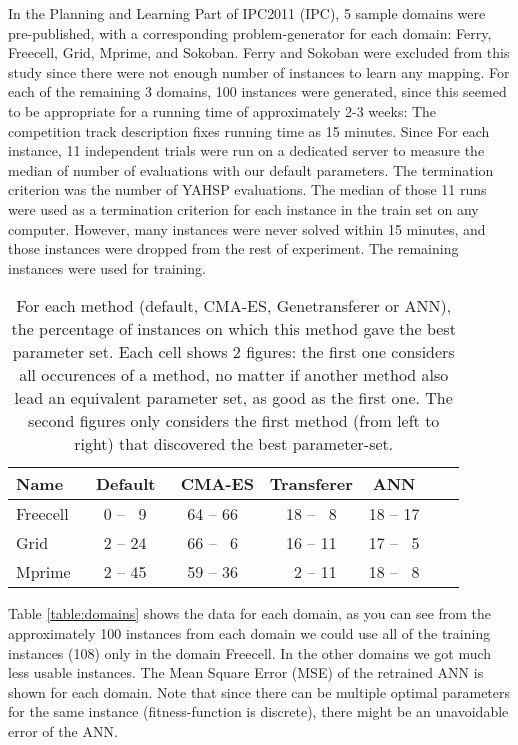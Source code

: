 \documentclass{MYsig-alternate}
\begin{document}
In the Planning and Learning Part of IPC2011 (IPC), 5 sample domains were pre-published, with a corresponding problem-generator for each domain: Ferry, Freecell, Grid, Mprime, and Sokoban. Ferry and Sokoban were excluded from this study since there were not enough number of instances to learn any mapping. For each of the remaining 3 domains, 100 instances were generated, since this seemed to be appropriate for a running time of approximately 2-3 weeks: The competition track description fixes running time as 15 minutes. Since For each instance, 11 independent trials were run on a dedicated server to measure the median of number of evaluations with our default parameters. The termination criterion was the number of YAHSP evaluations. The median of those 11 runs were used as a termination criterion for each instance in the train set on any computer. However, many instances were never solved within 15 minutes, and those instances were dropped from the rest of experiment. The remaining instances were used for training.


 \begin{table}[tb!]
\centering
\begin{tabular}{l c c c c c c}
\hline\hline
Name & \ Default & \ CMA-ES &  Transferer & ANN \\ 
\hline
Freecell & ~0 -- ~9& 64 -- 66  & 18 -- ~8  & 18 -- 17     \\
Grid & ~2 -- 24 & 66 -- ~6  & 16 -- 11 & 17 -- ~5  &    \\
Mprime &  ~2 -- 45& 59 -- 36 & ~2 -- 11  & 18 -- ~8  &    \\
\hline
\end{tabular}
\caption{For each method (default, CMA-ES, Genetransferer or ANN), the percentage of instances on which this method gave the best parameter set. Each cell shows 2 figures: the first one considers all occurences of a method, no matter if another method also lead an equivalent parameter set, as good as the first one. The second figures only considers the first method (from left to right) that discovered the best parameter-set.}
\label{table:hints}
\end{table} 


Table \ref{table:domains} shows the data for each domain, as you can see from the approximately 100 instances from each domain we could use all of the training instances (108) only in the domain Freecell. In the other domains we got much less usable instances. The Mean Square Error (MSE) of the retrained ANN is shown for each domain. Note that since there can be multiple optimal parameters for the same instance (fitness-function is discrete), there might be an unavoidable error of the ANN.
\end{document}
